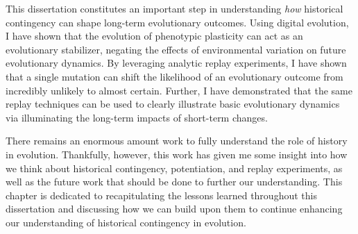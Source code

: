 This dissertation constitutes an important step in understanding \textit{how} historical contingency can shape long-term evolutionary outcomes.
Using digital evolution, I have shown that the evolution of phenotypic plasticity can act as an evolutionary stabilizer, negating the effects of environmental variation on future evolutionary dynamics.
By leveraging analytic replay experiments, I have shown that a single mutation can shift the likelihood of an evolutionary outcome from incredibly unlikely to almost certain. 
Further, I have demonstrated that the same replay techniques can be used to clearly illustrate basic evolutionary dynamics via illuminating the long-term impacts of short-term changes. 

There remains an enormous amount work to fully understand the role of history in evolution. 
Thankfully, however, this work has given me some insight into how we think about historical contingency, potentiation, and replay experiments, as well as the future work that should be done to further our understanding. 
This chapter is dedicated to recapitulating the lessons learned throughout this dissertation and discussing how we can build upon them to continue enhancing our understanding of historical contingency in evolution. 
